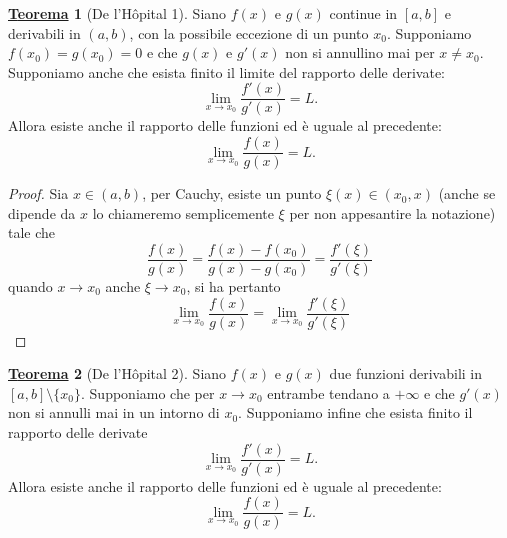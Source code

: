 \documentclass[a4paper,twoside]{article}
\theoremstyle{definition}
\newtheorem{theorem}{\color{Red}\underline{\textrm Teorema}}
\numberwithin{theorem}{section}
\begin{document}
\begin{theorem}[De l'H\^opital 1]
    Siano $f(x)$ e $g(x)$ continue in $[a,b]$ e derivabili in $(a,b)$, con la possibile eccezione di un punto $x_0$. Supponiamo $f(x_0)=g(x_0)=0$ e che $g(x)$ e $g'(x)$ non si annullino mai per  $x\neq x_0$. Supponiamo anche che esista finito il limite del rapporto delle derivate: $$\lim_{x\to x_0}\frac{f'(x)}{g'(x)}=L.$$ Allora esiste anche il rapporto delle funzioni ed è uguale al precedente: $$\lim_{x\to x_0}\frac{f(x)}{g(x)}=L.$$ 
\end{theorem}
\begin{proof}
    Sia $x\in(a,b)$, per Cauchy, esiste un punto $\xi(x)\in(x_0,x)$ (anche se dipende da $x$ lo chiameremo semplicemente $\xi$ per non appesantire la notazione) tale che $$\frac{f(x)}{g(x)}=\frac{f(x)-f(x_0)}{g(x)-g(x_0)}=\frac{f'(\xi)}{g'(\xi)}$$ quando $x\to x_0$ anche $\xi\to x_0$, si ha pertanto $$\lim_{x\to x_0}\frac{f(x)}{g(x)}=\lim_{x\to x_0}\frac{f'(\xi)}{g'(\xi)}$$
\end{proof}
\begin{theorem}[De l'H\^opital 2]
    Siano $f(x)$ e $g(x)$ due funzioni derivabili in $[a,b]\setminus\{x_0\}$. Supponiamo che per $x\to x_0$ entrambe tendano a $+\infty$ e che $g'(x)$ non si annulli mai in un intorno di $x_0$. Supponiamo infine che esista finito il rapporto delle derivate $$\lim_{x\to x_0}\frac{f'(x)}{g'(x)}=L.$$
    Allora esiste anche il rapporto delle funzioni ed è uguale al precedente: $$\lim_{x\to x_0}\frac{f(x)}{g(x)}=L.$$
\end{theorem}
\end{document}
